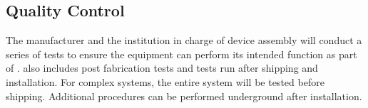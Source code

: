 \subsection{ Quality Control}

The manufacturer and the institution in charge of device assembly will
conduct a series of tests to ensure the equipment can perform its
intended function as part of .  also includes post fabrication
tests and tests run after shipping and installation. For complex
systems, the entire system will be tested before shipping. Additional
 procedures can be performed underground after installation.

\begin{comment}
The planned tests for each subsystem are described below.

\subsubsection{Purity Monitors}

The purity monitor system will undergo a series of tests to ensure the
system performs as intended.  These tests %
are based on the \dword{pdsp}
purity monitor \dword{qc} tests, which included electronic tests with a pulse
generator, mechanical and electrical connectivity tests at cryogenic
temperatures in a cryostat, and vacuum tests for short and full
assemblies in a dewar and in a long vacuum tube.

The \dword{qc} tests for \dword{fd} purity monitors begin with testing
individual purity monitors in vacuum after each is fabricated and
assembled. This test checks the amplitude of the signal generated by
the drift electrons at the cathode and the anode to ensure that the
photocathode can provide sufficient numbers of photoelectrons to
measure the signal attenuation with the required precision, and that
the field gradient resistors all work properly to maintain the drift
field. A smaller version of the assembly with all purity monitors
installed will be tested at the \dword{citf} to ensure the full system
performs as expected in \dword{lar}.

Next, the entire system is assembled on the full-length mounting tubes
to check the connections along the way. Ensuring that all electric and
optical connections are operating properly during this test reduces
the risk of problems once the full system is assembled and ready for
the final test in vacuum. The fully assembled system is placed in the
shipping tube, which serves as a vacuum chamber, and tested at
\dword{surf} before the system is inserted into the cryostat. During
insertion, electrical connections are tested continuously with
multimeters and electrometers.


\end{comment}
